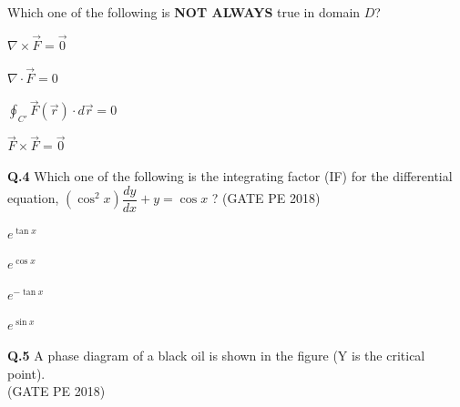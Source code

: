 \documentclass[15pt,a4paper]{article}
\begin{document}
\noindent
Which one of the following is \textbf{NOT ALWAYS} true in domain $D$?

\begin{enumerate}
\begin{multicols}{2}
\item $\nabla \times \vec{F} = \vec{0}$  \item $\nabla \cdot \vec{F} = 0$ \hspace{2em}
\item $\oint_{C'} \vec{F}(\vec{r}) \cdot d\vec{r} = 0$  \item $\vec{F} \times \vec{F} = \vec{0}$
\end{multicols}
\end{enumerate}

\noindent
\textbf{Q.4} Which one of the following is the integrating factor (IF) for the differential equation, $(\cos^2 x)\dfrac{dy}{dx} + y = \cos x$ ? \hfill(GATE PE 2018)


\begin{enumerate}
\begin{multicols}{2}
\item $e^{\tan x}$  \item $e^{\cos x}$ 
\item $e^{-\tan x}$  \item $e^{\sin x}$
\end{multicols}
\end{enumerate}

\pagebreak

\noindent
\textbf{Q.5} A phase diagram of a black oil is shown in the figure (Y is the critical point).\\\hfill(GATE PE 2018)
\end{document}

